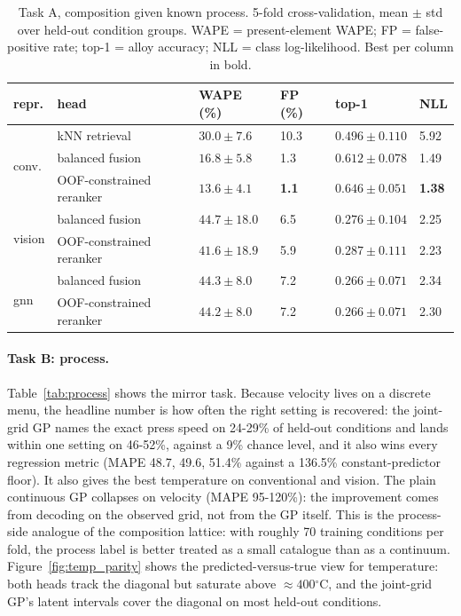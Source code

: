 \documentclass{article}
\newcommand{\degC}{${}^{\circ}$C}
\begin{document}
\begin{table}[t]
  \caption{Task A, composition given known process. 5-fold cross-validation,
  mean $\pm$ std over held-out condition groups. WAPE = present-element WAPE;
  FP = false-positive rate; top-1 = alloy accuracy; NLL = class
  log-likelihood. Best per column in bold.}
  \label{tab:composition}
  \centering\small
  \begin{tabularx}{\linewidth}{@{}llXXXX@{}}
    \toprule
    repr. & head & WAPE (\%) & FP (\%) & top-1 & NLL \\
    \midrule
    \multirow{3}{*}{conv.}
      & kNN retrieval & $30.0 \pm 7.6$ & 10.3 & $0.496 \pm 0.110$ & 5.92 \\
      & balanced fusion & $16.8 \pm 5.8$ & 1.3 & $0.612 \pm 0.078$ & 1.49 \\
      & OOF-constrained reranker & $\mathbf{13.6 \pm 4.1}$ & \textbf{1.1} & $\mathbf{0.646 \pm 0.051}$ & \textbf{1.38} \\
    \midrule
    \multirow{2}{*}{vision}
      & balanced fusion & $44.7 \pm 18.0$ & 6.5 & $0.276 \pm 0.104$ & 2.25 \\
      & OOF-constrained reranker & $41.6 \pm 18.9$ & 5.9 & $0.287 \pm 0.111$ & 2.23 \\
    \midrule
    \multirow{2}{*}{gnn}
      & balanced fusion & $44.3 \pm 8.0$ & 7.2 & $0.266 \pm 0.071$ & 2.34 \\
      & OOF-constrained reranker & $44.2 \pm 8.0$ & 7.2 & $0.266 \pm 0.071$ & 2.30 \\
    \bottomrule
  \end{tabularx}
\end{table}

\paragraph{Task B: process.} Table~\ref{tab:process} shows the mirror task.
Because velocity lives on a discrete menu, the headline number is how often the
right setting is recovered: the joint-grid GP names the exact press speed on
24-29\% of held-out conditions and lands within one setting on 46-52\%, against
a 9\% chance level, and it also wins every regression metric (MAPE
48.7, 49.6, 51.4\% against a 136.5\% constant-predictor floor). It also gives
the best temperature on conventional and vision. The plain continuous GP
collapses on velocity (MAPE 95-120\%): the improvement comes from decoding on
the observed grid, not from the GP itself.
This is the process-side analogue of the composition lattice: with roughly 70
training conditions per fold, the process label is better treated as a small
catalogue than as a continuum. Figure~\ref{fig:temp_parity} shows the
predicted-versus-true view for temperature: both heads track the diagonal but
saturate above $\approx 400$\degC, and the joint-grid GP's latent intervals
cover the diagonal on most held-out conditions.
\end{document}
